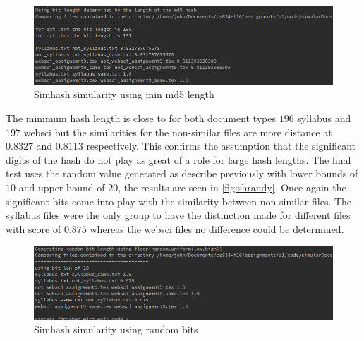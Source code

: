 \documentclass[11pt]{article}
\newenvironment{code}{\captionsetup{type=listing}}{}
\begin{document}
\begin{figure}[h]
\centering
	\includegraphics[scale=0.6]{simhashMD5.png}
	\caption{Simhash simularity using min md5 length} \label{fig:shmd5}
\end{figure}\newline
The minimum hash length is close to for both document types $196$ syllabus and $197$ websci but the similarities for the non-similar files are more distance at $0.8327$ and $0.8113$ respectively. This confirms the assumption that the significant digits of the hash do not play as great of a role for large hash lengths.\newpage
\noindent
The final test uses the random value generated as describe previously with lower bounds of $10$ and upper bound of $20$, the results are seen in \autoref{fig:shrandy}. Once again the significant bits come into play with the similarity between non-similar files. The syllabus files were the only group to have the distinction made for different files with score of $0.875$ whereas the websci files no difference could be determined.
\begin{figure}[h]
\centering
	\includegraphics[scale=0.6]{randBits.png}
	\caption{Simhash simularity using random bits} \label{fig:shrandy}
\end{figure}\newline
\begin{code}
	\label{code:simhash}
\end{code}
\newpage
\clearpage

\end{document}

